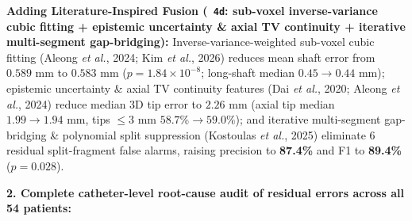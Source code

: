 \documentclass[
  11pt,
]{article}
\let\nforigtexttt\texttt
\renewcommand{\texttt}[1]{\nforigtexttt{\XeTeXinterchartokenstate=1 #1}}
\begin{document}
\begin{itemize}
  \textbf{Adding Literature-Inspired Fusion (\texttt{4d}: sub-voxel
  inverse-variance cubic fitting + epistemic uncertainty \& axial TV
  continuity + iterative multi-segment gap-bridging):}
  Inverse-variance-weighted sub-voxel cubic fitting (Aleong \emph{et
  al.}, 2024; Kim \emph{et al.}, 2026) reduces mean shaft error from
  \(0.589\text{ mm}\) to \textbf{\(0.583\text{ mm}\)}
  (\(p = 1.84 \times 10^{-8}\); long-shaft median
  \(0.45 \to 0.44\text{ mm}\)); epistemic uncertainty \& axial TV
  continuity features (Dai \emph{et al.}, 2020; Aleong \emph{et al.},
  2024) reduce median 3D tip error to \textbf{\(2.26\text{ mm}\)} (axial
  tip median \(1.99 \to 1.94\text{ mm}\), tips \(\le 3\text{ mm}\)
  \(58.7\% \to 59.0\%\)); and iterative multi-segment gap-bridging \&
  polynomial split suppression (Kostoulas \emph{et al.}, 2025) eliminate
  6 residual split-fragment false alarms, raising precision to
  \textbf{87.4\%} and F1 to \textbf{89.4\%} (\(p = 0.028\)).
\end{itemize}

\textbf{2. Complete catheter-level root-cause audit of residual errors
across all 54 patients:}
\end{document}
